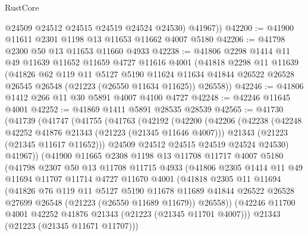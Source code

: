 \begin{lexlean}{RustCore}
\begin{coremodule}
          @24509
          @24512
          @24515
          @24519
          @24524
          @24530)
        @41967))
@42200 := @41900 @11611 @2301 @1198 @13 @11653 @11662 @4007 @5180
@42206 := @41798 @2300 @50 @13 @11653 @11660 @4933
@42238 := @41806
    @2298
    @1414
    @11
    @49
    @11639
    @11652
    @11659
    @4727
    @11616
    @4001
    (@41818
      @2298
      @11
      @11639
      (@41826
        @62
        @119
        @11
        @5127
        @5190
        @11624
        @11634
        @41844
        @26522
        @26528
        @26545
        @26548
        (@21223 (@26550 @11634 @11625))
        @26558))
@42246 := @41806 @1412 @266 @11 @30 @5891 @4007 @4100 @4727
@42248 := @42246 @11645 @4001
@42252 := @41869 @1411 @5891 @28535 @28539
@42565 := @41730
    (@41739
      (@41747
        (@41755
          (@41763
            (@42192
              (@42200
                (@42206
                  (@42238
                    (@42248 @42252 @41876 @21343 (@21223 (@21345 @11646 @4007)))
                    @21343
                    (@21223 (@21345 @11617 @11652)))
                  @24509
                  @24512
                  @24515
                  @24519
                  @24524
                  @24530)
                @41967))
            (@41900
              @11665
              @2308
              @1198
              @13
              @11708
              @11717
              @4007
              @5180
              (@41798
                @2307
                @50
                @13
                @11708
                @11715
                @4933
                (@41806
                  @2305
                  @1414
                  @11
                  @49
                  @11694
                  @11707
                  @11714
                  @4727
                  @11670
                  @4001
                  (@41818
                    @2305
                    @11
                    @11694
                    (@41826
                      @76
                      @119
                      @11
                      @5127
                      @5190
                      @11678
                      @11689
                      @41844
                      @26522
                      @26528
                      @27699
                      @26548
                      (@21223 (@26550 @11689 @11679))
                      @26558))
                  (@42246 @11700 @4001 @42252 @41876 @21343 (@21223 (@21345 @11701 @4007)))
                  @21343
                  (@21223 (@21345 @11671 @11707)))

\end{coremodule}
\end{lexlean}
